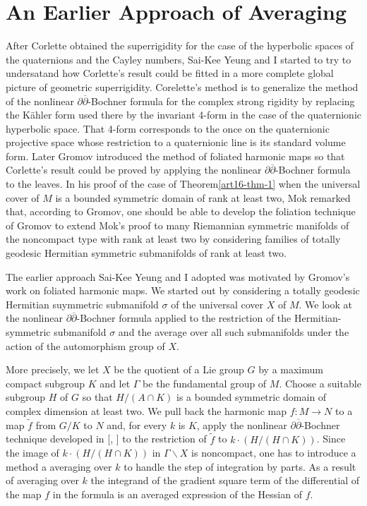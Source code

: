 \section*{An Earlier Approach of Averaging}
After Corlette \cite{art16-keyCo} obtained the superrigidity for the case of the hyperbolic spaces of the quaternions and the Cayley numbers, Sai-Kee Yeung and I started to try to undersatand how Corlette's result could be fitted in a more complete global picture of geometric superrigidity. Corelette's method is to generalize the method of the nonlinear $\partial\overline{\partial}$-Bochner formula for the complex strong rigidity by replacing the K\"ahler form used there by the invariant 4-form in the case of the quaternionic hyperbolic space. That 4-form corresponds to the once on the quaternionic projective space whose restriction to a quaternionic line is its standard volume form. Later Gromov \cite{art16-keyG} introduced the method of foliated harmonic maps so that Corlette's result could be proved by applying the nonlinear $\partial\overline{\partial}$-Bochner formula to the leaves. In his proof of the case of Theorem\ref{art16-thm-1} when the universal cover of $M$ is a bounded symmetric domain of rank at least two, Mok \cite{art16-keyMo} remarked that, according to Gromov, one should be able to develop the foliation technique of Gromov \cite{art16-keyG} to extend Mok's proof to many Riemannian symmetric manifolds of the noncompact type with rank at least two by considering families of totally geodesic Hermitian symmetric submanifolds of rank at least two.

The earlier approach Sai-Kee Yeung and I adopted was motivated by Gromov's work on foliated harmonic maps. We started out by considering a totally geodesic Hermitian suymmetric submanifold $\sigma$ of the universal cover $X$ of $M$. We look at the nonlinear $\partial\overline{\partial}$-Bochner formula applied to the restriction of the Hermitian-symmetric submanifold $\sigma$ and the average over all such submanifolds under the action of the automorphism group of $X$.

More precisely, we let $X$ be the quotient of a Lie group $G$ by a maximum compact subgroup $K$ and let $\Gamma$ be the fundamental group of $M$. Choose a suitable subgroup $H$ of $G$ so that $H/(A\cap K)$ is a bounded symmetric domain of complex dimension at least two. We pull back the harmonic map $f: M \rightarrow N$ to a map $\tilde{f}$ from $G/K$ to $N$ and, for every $k$ is $K$, apply the nonlinear $\partial\overline{\partial}$-Bochner technique developed in [\cite{art16-keySi}, \cite{art16-keySa}] to the restriction of $\tilde{f}$ to $k \cdot(H/(H \cap K))$. Since the image of $k\cdot (H /(H \cap K))$ in $\Gamma\backslash X$ is noncompact, one has to introduce a method a averaging over $k$ to handle the step of integration by parts. As a result of averaging over $k$ the integrand of the gradient square term of the differential of the map $f$ in the formula is an averaged expression of the Hessian of $f$.

